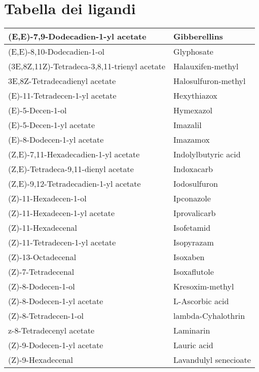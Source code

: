 \appendix

\chapter{Tabella dei ligandi}
\begin{small}
    \begin{longtable}{|l|l|}
        \hline 
        (E,E)-7,9-Dodecadien-1-yl acetate & Gibberellins \\ \hline
        (E,E)-8,10-Dodecadien-1-ol & Glyphosate \\ \hline
        (3E,8Z,11Z)-Tetradeca-3,8,11-trienyl acetate & Halauxifen-methyl \\ \hline
        3E,8Z-Tetradecadienyl acetate & Halosulfuron-methyl \\ \hline
        (E)-11-Tetradecen-1-yl acetate & Hexythiazox \\ \hline
        (E)-5-Decen-1-ol & Hymexazol \\ \hline
        (E)-5-Decen-1-yl acetate & Imazalil \\ \hline
        (E)-8-Dodecen-1-yl acetate & Imazamox \\ \hline
        (Z,E)-7,11-Hexadecadien-1-yl acetate & Indolylbutyric acid \\ \hline
        (Z,E)-Tetradeca-9,11-dienyl acetate & Indoxacarb \\ \hline
        (Z,E)-9,12-Tetradecadien-1-yl acetate & Iodosulfuron \\ \hline
        (Z)-11-Hexadecen-1-ol & Ipconazole \\ \hline
        (Z)-11-Hexadecen-1-yl acetate & Iprovalicarb \\ \hline
        (Z)-11-Hexadecenal & Isofetamid \\ \hline
        (Z)-11-Tetradecen-1-yl acetate & Isopyrazam \\ \hline
        (Z)-13-Octadecenal & Isoxaben \\ \hline
        (Z)-7-Tetradecenal & Isoxaflutole \\ \hline
        (Z)-8-Dodecen-1-ol & Kresoxim-methyl \\ \hline
        (Z)-8-Dodecen-1-yl acetate & L-Ascorbic acid \\ \hline
        (Z)-8-Tetradecen-1-ol & lambda-Cyhalothrin \\ \hline
        z-8-Tetradecenyl acetate & Laminarin \\ \hline
        (Z)-9-Dodecen-1-yl acetate & Lauric acid \\ \hline
        (Z)-9-Hexadecenal & Lavandulyl senecioate \\ \hline

\end{longtable}
\end{small}

